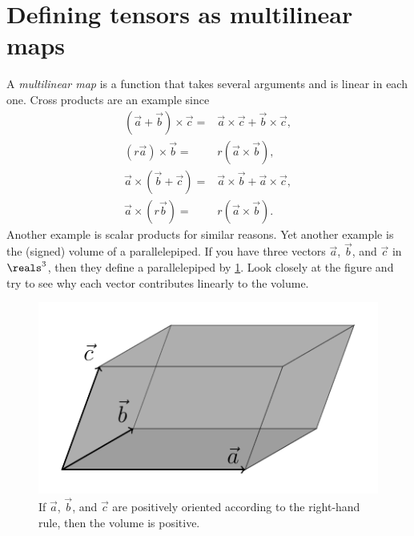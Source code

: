 \section{Defining tensors as multilinear maps}%
\label{sec:defining_tensors_as_multilinear_maps}

A \emph{multilinear map} is a function that takes several arguments and is linear in each one.
Cross products are an example since
\begin{align*}
	(\vec{a} + \vec{b}) \times \vec{c} ={}& \vec{a} \times \vec{c} + \vec{b} \times \vec{c},\\
	(r \vec{a}) \times \vec{b} ={}& r (\vec{a} \times \vec{b}),\\
	\vec{a} \times (\vec{b} + \vec{c}) ={}& \vec{a} \times \vec{b} + \vec{a} \times \vec{c},\\
	\vec{a} \times (r \vec{b}) ={}& r (\vec{a} \times \vec{b}).
\end{align*}
Another example is scalar products for similar reasons.
Yet another example is the (signed) volume of a parallelepiped.
If you have three vectors $\vec a$, $\vec b$, and $\vec c$ in $\reals^3$, then they define a parallelepiped by \cref{fig:parallelepiped}.
Look closely at the figure and try to see why each vector contributes linearly to the volume.

\begin{figure}[ht]
	\centering
	\includegraphics[]{figures/parallelepiped.pdf}
	\caption{If $\vec a$, $\vec b$, and $\vec c$ are positively oriented according to the right-hand rule, then the volume is positive.}%
	\label{fig:parallelepiped}
\end{figure}

